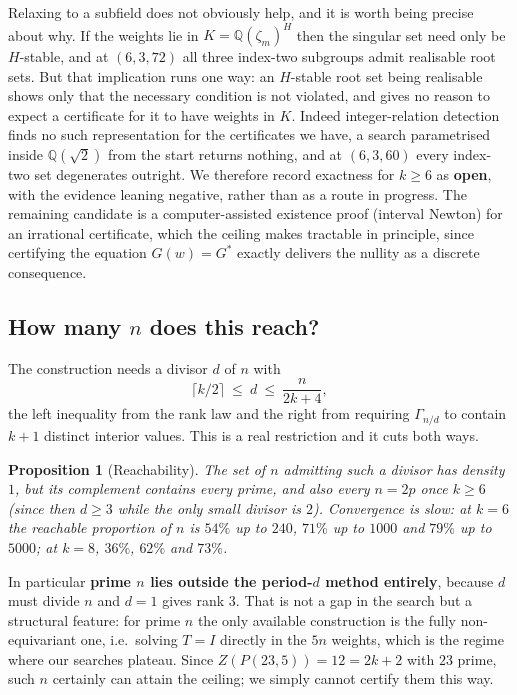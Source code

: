 \documentclass[11pt]{article}
\newtheorem{proposition}[theorem]{Proposition}
\theoremstyle{definition}
\begin{document}
Relaxing to a subfield does not obviously help, and it is worth being precise
about why. If the weights lie in $K=\mathbb Q(\zeta_m)^H$ then the singular set
need only be $H$-stable, and at $(6,3,72)$ all three index-two subgroups admit
realisable root sets. But that implication runs one way: an $H$-stable root set
being realisable shows only that the necessary condition is not violated, and
gives no reason to expect a certificate for it to have weights in $K$. Indeed
integer-relation detection finds no such representation for the certificates we
have, a search parametrised inside $\mathbb Q(\sqrt2)$ from the start returns
nothing, and at $(6,3,60)$ every index-two set degenerates outright. We
therefore record exactness for $k\ge6$ as \textbf{open}, with the evidence
leaning negative, rather than as a route in progress. The remaining candidate
is a computer-assisted existence proof (interval Newton) for an irrational
certificate, which the ceiling makes tractable in principle, since certifying
the equation $G(w)=G^\ast$ exactly delivers the nullity as a discrete
consequence.

\subsection*{How many $n$ does this reach?}
The construction needs a divisor $d$ of $n$ with
\[
  \lceil k/2\rceil\ \le\ d\ \le\ \frac{n}{2k+4},
\]
the left inequality from the rank law and the right from requiring $\Gamma_{n/d}$
to contain $k+1$ distinct interior values. This is a real restriction and it
cuts both ways.

\begin{proposition}[Reachability]\label{prop:reach}
The set of $n$ admitting such a divisor has density $1$, but its complement
contains \emph{every prime}, and also every $n=2p$ once $k\ge6$ (since then
$d\ge3$ while the only small divisor is $2$). Convergence is slow: at $k=6$
the reachable proportion of $n$ is $54\%$ up to $240$, $71\%$ up to $1000$ and
$79\%$ up to $5000$; at $k=8$, $36\%$, $62\%$ and $73\%$.
\end{proposition}

\noindent
In particular \textbf{prime $n$ lies outside the period-$d$ method entirely},
because $d$ must divide $n$ and $d=1$ gives rank $3$. That is not a gap in the
search but a structural feature: for prime $n$ the only available construction
is the fully non-equivariant one, i.e.\ solving $T=I$ directly in the $5n$
weights, which is the regime where our searches plateau. Since
$Z(P(23,5))=12=2k+2$ with $23$ prime, such $n$ certainly can attain the
ceiling; we simply cannot certify them this way.
\end{document}
